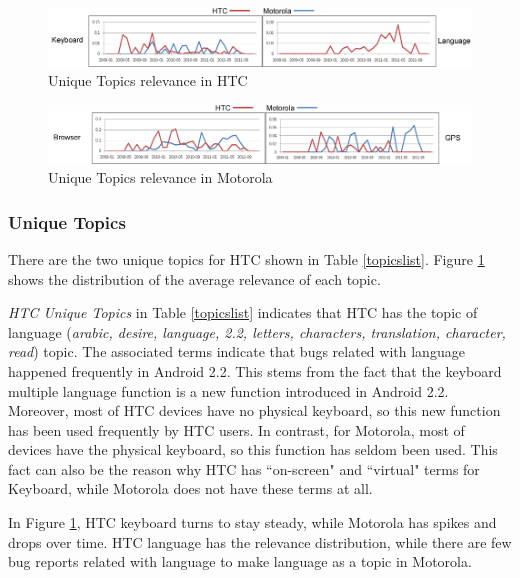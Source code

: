 \documentclass[10pt, conference, compsocconf]{IEEEtran}
\begin{document}


\begin{figure}[htb]
\centering
\includegraphics[width=1\textwidth]{uniquehtc.png}
\caption{Unique Topics relevance in HTC}
\label{uniquehtc}
\end{figure}

\begin{figure}[htb]
\centering
\includegraphics[width=1\textwidth]{uniquemoto.png}
\caption{Unique Topics relevance in Motorola}
\label{uniquemoto}
\end{figure}


\subsubsection{Unique Topics}

There are the two unique topics for HTC shown in Table \ref{topicslist}. Figure \ref{uniquehtc} shows the distribution of the average relevance of each topic.

\textit{HTC Unique Topics} in Table \ref{topicslist} indicates that HTC has the topic of language (\textit{arabic, desire, language, 2.2, letters, characters, translation, character, read}) topic. The associated terms indicate that bugs related with language happened frequently in Android 2.2. This stems from the fact that the keyboard multiple language function is a new function introduced in Android 2.2. Moreover, most of HTC devices have no physical keyboard, so this new function has been used frequently by HTC users. In contrast, for Motorola, most of devices have the physical keyboard, so this function has seldom been used. This fact can also be the reason why HTC has ``on-screen" and ``virtual" terms for Keyboard, while Motorola does not have these terms at all.

In Figure \ref{uniquehtc}, HTC keyboard turns to stay steady, while Motorola has spikes and drops over time. HTC language has the relevance distribution, while there are few bug reports related with language to make language as a topic in Motorola.
\end{document}
